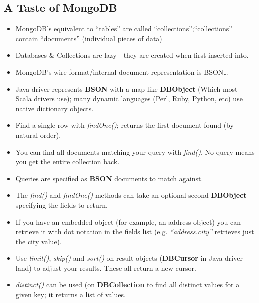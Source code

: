 \documentclass{beamer}
\newenvironment{itemizeframe}
               {\begin{frame}\startitemizeframe} 
               {\stopitemizeframe\end{frame}}
\newenvironment{itemizecodeframe}
              {\begin{frame}[allowframebreaks,allowdisplaybreaks]
              \startitemizeframe} 
              {\stopitemizeframe\end{frame}}
\newcommand\startitemizeframe{\begin{itemize}} \newcommand\stopitemizeframe{\end{itemize}}
\begin{document}
\subsection{A Taste of MongoDB}
\begin{itemizeframe}
    \frametitle{Core Concepts}
    \item MongoDB's equivalent to ``tables'' are called ``collections'';``collections'' contain ``documents'' (individual pieces of data)
    \item Databases \& Collections are lazy - they are created when first inserted into.
    \item MongoDB's wire format/internal document representation is BSON\ldots
    \item {\scriptsize Java driver represents {\bf BSON} with a map-like {\bf DBObject} (Which most Scala drivers use); many dynamic languages (Perl, Ruby, Python, etc) use native dictionary objects. }
\end{itemizeframe}



\begin{itemizecodeframe}
\frametitle{The basics of Querying}
    \item Find a single row with \emph{findOne()}; returns the first document found (by natural order).  
    \item You can find all documents matching your query with \emph{find()}.  No query means you get the entire collection back.
    \item Queries are specified as {\bf BSON} documents to match against.
    \item The \emph{find()} and \emph{findOne()} methods can take an optional second {\bf DBObject} specifying the fields to return.
    \item If you have an embedded object (for example, an address object) you can retrieve it with dot notation in the fields list (e.g. {\em ``address.city''} retrieves just the city value).
    \item Use {\em limit()}, {\em skip()} and {\em sort()} on result objects ({\bf DBCursor} in Java-driver land) to adjust your results.  These all return a new cursor.  
    \item {\em distinct()} can be used (on {\bf DBCollection} to find all distinct values for a given key; it returns a list of values.

\end{itemizecodeframe}
\end{document}
